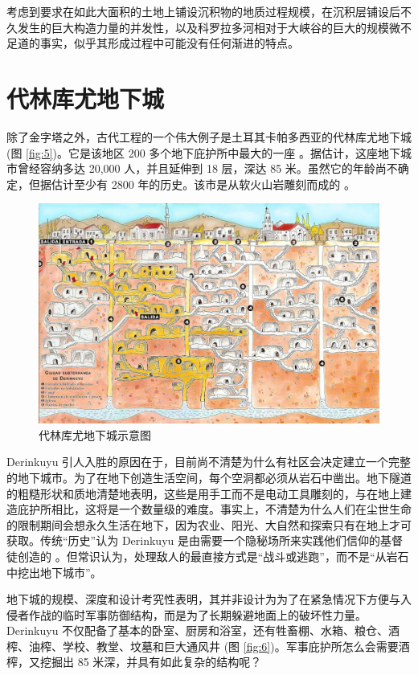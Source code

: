 \documentclass[10pt,twocolumn,letterpaper]{article}
\begin{document}
考虑到要求在如此大面积的土地上铺设沉积物的地质过程规模，在沉积层铺设后不久发生的巨大构造力量的并发性，以及科罗拉多河相对于大峡谷的巨大的规模微不足道的事实，似乎其形成过程中可能没有任何渐进的特点。

\section{代林库尤地下城}

除了金字塔之外，古代工程的一个伟大例子是土耳其卡帕多西亚的代林库尤地下城 (图 \ref{fig:5})。它是该地区 200 多个地下庇护所中最大的一座 \cite{54}。据估计，这座地下城市曾经容纳多达 20,000 人，并且延伸到 18 层，深达 85 米。虽然它的年龄尚不确定，但据估计至少有 2800 年的历史。该市是从软火山岩雕刻而成的 \cite{52, 53}。

\begin{figure}[b]
\begin{center}
   \includegraphics[width=1\linewidth]{derinkuyu.jpeg}
\end{center}
   \caption{代林库尤地下城示意图 \cite{56}}
\label{fig:5}
\label{fig:onecol}
\end{figure}

Derinkuyu 引人入胜的原因在于，目前尚不清楚为什么有社区会决定建立一个完整的地下城市。为了在地下创造生活空间，每个空洞都必须从岩石中凿出。地下隧道的粗糙形状和质地清楚地表明，这些是用手工而不是电动工具雕刻的，与在地上建造庇护所相比，这将是一个数量级的难度。事实上，不清楚为什么人们在尘世生命的限制期间会想永久生活在地下，因为农业、阳光、大自然和探索只有在地上才可获取。传统“历史”认为 Derinkuyu 是由需要一个隐秘场所来实践他们信仰的基督徒创造的 \cite{53}。但常识认为，处理敌人的最直接方式是“战斗或逃跑”，而不是“从岩石中挖出地下城市”。

地下城的规模、深度和设计考究性表明，其并非设计为为了在紧急情况下方便与入侵者作战的临时军事防御结构，而是为了长期躲避地面上的破坏性力量。Derinkuyu 不仅配备了基本的卧室、厨房和浴室，还有牲畜棚、水箱、粮仓、酒榨、油榨、学校、教堂、坟墓和巨大通风井 (图 \ref{fig:6})。军事庇护所怎么会需要酒榨，又挖掘出 85 米深，并具有如此复杂的结构呢？
\end{document}

